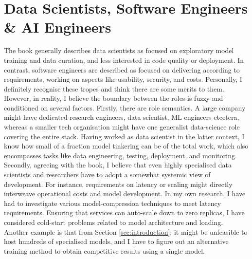 \documentclass[11pt]{article}
\begin{document}
\section{Data Scientists, Software Engineers \& AI Engineers}
The book generally describes data scientists as focused on exploratory model training and data curation, and less interested in code quality or deployment. In contrast, software engineers are described as focused on delivering according to requirements, working on aspects like usability, security, and costs. Personally, I definitely recognise these tropes and think there are some merits to them. However, in reality, I believe the boundary between the roles is fuzzy and conditioned on several factors. Firstly, there are role semantics. A large company might have dedicated research engineers, data scientist, ML engineers etcetera, whereas a smaller tech organisation might have one generalist data-science role covering the entire stack. Having worked as data scientist in the latter context, I know how small of a fraction model tinkering can be of the total work, which also encompasses tasks like data engineering, testing, deployment, and monitoring. Secondly, agreeing with the book, I believe that even highly specialised data scientists and researchers have to adopt a somewhat systemic view of development. For instance, requirements on latency or scaling might directly interweave operational costs and model development. In my own research, I have had to investigate various model-compression techniques to meet latency requirements. Ensuring that services can auto-scale down to zero replicas, I have considered cold-start problems related to model architecture and loading. Another example is that from Section \ref{sec:introduction}: it might be unfeasible to host hundreds of specialised models, and I have to figure out an alternative training method to obtain competitive results using a single model.
\end{document}
